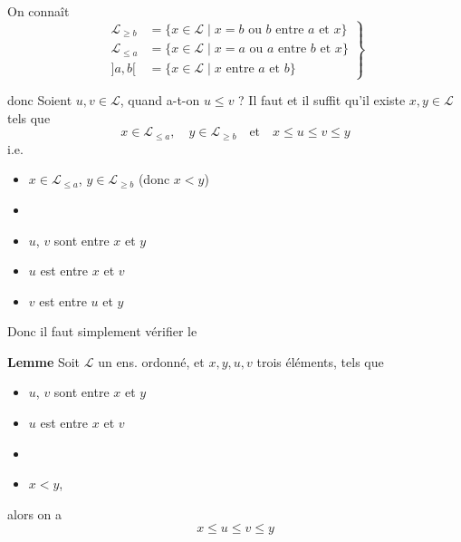 \documentclass[11pt,a4paper]{article}
\begin{document}
On connaît
\[
  \left.
  \begin{aligned}
    \mathcal{L}_{\geq b} &= \{x \in \mathcal{L} \mid x = b \text{ ou } b \text{ entre } a \text{ et } x\} \\
    \mathcal{L}_{\leq a} &= \{x \in \mathcal{L} \mid x = a \text{ ou } a \text{ entre } b \text{ et } x\} \\
    ]a, b[ &= \{x \in \mathcal{L} \mid x \text{ entre } a \text{ et } b\}
  \end{aligned}
  \right\}
\]

donc  Soient $u, v \in \mathcal{L}$, quand a-t-on $u \leq v$ ? Il faut et il suffit qu'il existe  $x, y \in \mathcal{L}$ tels que
\[
  x \in \mathcal{L}_{\leq a},\quad y \in \mathcal{L}_{\geq b} \quad \text{et} \quad x \leq u \leq v \leq y
\]
i.e.
\begin{itemize}
  \item[]  $x \in \mathcal{L}_{\leq a}$, $y \in \mathcal{L}_{\geq b}$ (donc $x < y$)
  \item[]  
  \item[]  $u$, $v$ sont entre $x$ et $y$
  \item[] $u$ est entre $x$ et $v$
  \item[] $v$ est entre $u$ et $y$
\end{itemize}

Donc il faut simplement vérifier le

\textbf{Lemme} Soit $\mathcal{L}$ un ens. ordonné, et $x, y, u, v$ trois éléments, tels que
\begin{itemize}
  \item[a)] $u$, $v$ sont entre $x$ et $y$
  \item[b)] $u$ est entre $x$ et $v$
  \item[c)] [$v$ est entre $u$ et $y$ \struck{\ill{}}]
  \item[d)] $x < y$,
\end{itemize}
alors on a
\[
  x \leq u \leq v \leq y
\]
\end{document}
